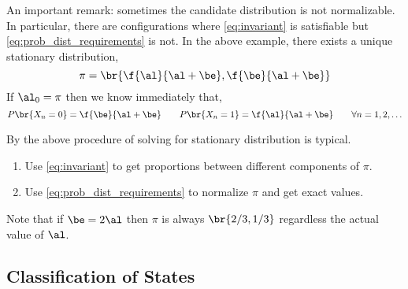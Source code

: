 \documentclass{article}
\begin{document}
An important remark: sometimes the candidate distribution is not normalizable. In particular, there are configurations where \cref{eq:invariant} is satisfiable but \cref{eq:prob_dist_requirements} is not. In the above example, there exists a unique stationary distribution,
\[ \pi = \br{\f{\al}{\al + \be} ,\f{\be}{\al + \be}} \]
If $\al_0 = \pi$ then we know immediately that,
\[ P\br{X_n = 0} = \f{\be}{\al+\be} \qquad P\br{X_n = 1} = \f{\al}{\al+\be} \qquad \forall n = 1, 2, \ldots\]
\begin{remark}
    By the above procedure of solving for stationary distribution is typical.
    \begin{enumerate}
        \item Use \cref{eq:invariant} to get proportions between different components of $\pi$.
        \item Use \cref{eq:prob_dist_requirements} to normalize $\pi$ and get exact values.
    \end{enumerate}
\end{remark}
\begin{remark}
    Note that if $\be = 2 \al$ then $\pi$ is always $\br{2/3, 1/3}$ regardless the actual value of $\al$.
\end{remark}

\subsection{Classification of States}
\newcommand{\comm}{\leftrightarrow}
\newcommand{\acc}[2]{#1 \to #2}
\end{document}
